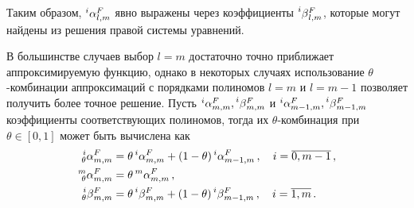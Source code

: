 \documentclass[../document.tex]{subfiles}
\begin{document}
                    Таким образом, $\prescript{i}{}{\alpha}_{l,m}^F$ явно выражены через коэффициенты $\prescript{i}{}{\beta}_{l,m}^F$, которые могут найдены из решения правой системы уравнений.
                    \par В большинстве случаев выбор $l=m$ достаточно точно приближает аппроксимируемую функцию, однако в некоторых случаях использование $\theta$-комбинации \cite{chui,xavier} аппроксимаций с порядками полиномов $l=m$ и $l=m-1$ позволяет получить более точное решение. Пусть $\prescript{i}{}{\alpha}_{m,m}^F,\prescript{i}{}{\beta}_{m,m}^F$ и $\prescript{i}{}{\alpha}_{m-1,m}^F,\prescript{i}{}{\beta}_{m-1,m}^F$ коэффициенты соответствующих полиномов, тогда их $\theta$-комбинация при $\theta\in\left[0,1\right]$ может быть вычислена как
                    \begin{equation}
                        \begin{aligned}
                            \prescript{i}{\theta}{\alpha}_{m,m}^F&=\theta\prescript{i}{}{\alpha}_{m,m}^F+\left(1-\theta\right)\prescript{i}{}{\alpha}_{m-1,m}^F\,,\quad i=\overline{0,m-1}\,,\\
                            \prescript{m}{\theta}{\alpha}_{m,m}^F&=\theta\prescript{m}{}{\alpha}_{m,m}^F\,,\\
                            \prescript{i}{\theta}{\beta}_{m,m}^F&=\theta\prescript{i}{}{\beta}_{m,m}^F+\left(1-\theta\right)\prescript{i}{}{\beta}_{m-1,m}^F\,,\quad i=\overline{1,m}\,.
                        \end{aligned}
                    \end{equation}
\end{document}
